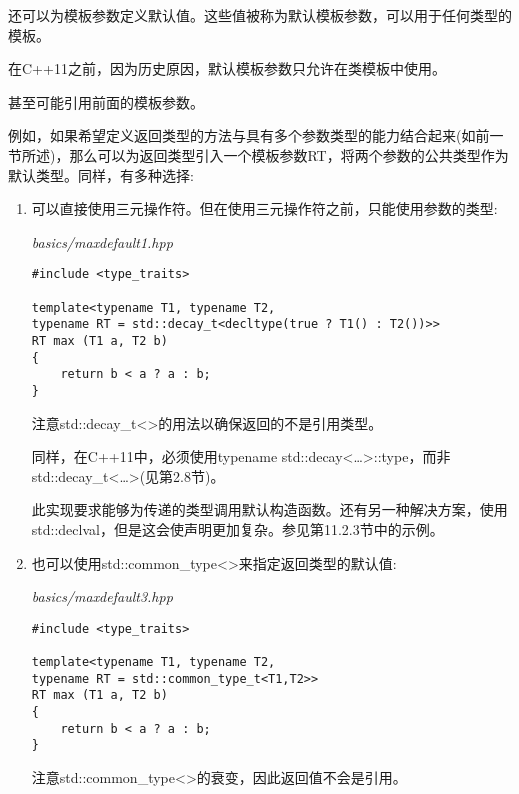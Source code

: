 还可以为模板参数定义默认值。这些值被称为默认模板参数，可以用于任何类型的模板。

\begin{tcolorbox}[colback=webgreen!5!white,colframe=webgreen!75!black]
\hspace*{0.75cm}在C++11之前，因为历史原因，默认模板参数只允许在类模板中使用。
\end{tcolorbox}

甚至可能引用前面的模板参数。

例如，如果希望定义返回类型的方法与具有多个参数类型的能力结合起来(如前一节所述)，那么可以为返回类型引入一个模板参数RT，将两个参数的公共类型作为默认类型。同样，有多种选择:

\begin{enumerate}
\item 
可以直接使用三元操作符。但在使用三元操作符之前，只能使用参数的类型:

\noindent
\textit{basics/maxdefault1.hpp}
\begin{lstlisting}[style=styleCXX]
#include <type_traits>

template<typename T1, typename T2,
typename RT = std::decay_t<decltype(true ? T1() : T2())>>
RT max (T1 a, T2 b)
{
	return b < a ? a : b;
}
\end{lstlisting}

注意std::decay\_t<>的用法以确保返回的不是引用类型。

\begin{tcolorbox}[colback=webgreen!5!white,colframe=webgreen!75!black]
\hspace*{0.75cm}同样，在C++11中，必须使用typename std::decay<…>::type，而非std::decay\_t<…>(见第2.8节)。
\end{tcolorbox}

此实现要求能够为传递的类型调用默认构造函数。还有另一种解决方案，使用std::declval，但是这会使声明更加复杂。参见第11.2.3节中的示例。

\item
也可以使用std::common\_type<>来指定返回类型的默认值:

\noindent
\textit{basics/maxdefault3.hpp}
\begin{lstlisting}[style=styleCXX]
#include <type_traits>

template<typename T1, typename T2,
typename RT = std::common_type_t<T1,T2>>
RT max (T1 a, T2 b)
{
	return b < a ? a : b;
}
\end{lstlisting}

注意std::common\_type<>的衰变，因此返回值不会是引用。
\end{enumerate}

